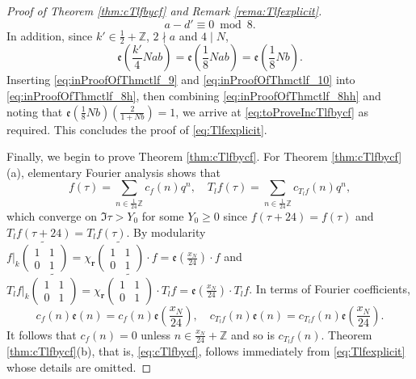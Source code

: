 \documentclass[12pt]{amsart}
\numberwithin{equation}{section}
\theoremstyle{plain}
\theoremstyle{definition}
\theoremstyle{remark}
\newcommand\legendre[2]{\genfrac{(}{)}{}{}{#1}{#2}}
\newcommand\tbtmat[4]{\left(\begin{smallmatrix}{#1} & {#2} \\ {#3} & {#4}\end{smallmatrix}\right)}
\newcommand\etp[1]{\mathfrak{e}\left(#1\right)}
\newcommand\numZ{\mathbb{Z}}
\begin{document}
\begin{proof}[Proof of Theorem \ref{thm:cTlfbycf} and Remark \ref{rema:Tlfexplicit}]
\begin{equation}
\label{eq:inProofOfThmctlf_9}
a-d'\equiv0\bmod{8}.
\end{equation}
In addition, since $k'\in\frac{1}{2}+\numZ$, $2\nmid a$ and $4\mid N$,
\begin{equation}
\label{eq:inProofOfThmctlf_10}
\etp{\frac{k'}{4}Nab}=\etp{\frac{1}{8}Nab}=\etp{\frac{1}{8}Nb}.
\end{equation}
Inserting \eqref{eq:inProofOfThmctlf_9} and \eqref{eq:inProofOfThmctlf_10} into \eqref{eq:inProofOfThmctlf_8h}, then combining \eqref{eq:inProofOfThmctlf_8hh} and noting that $\etp{\frac{1}{8}Nb}\legendre{2}{1+Nb}=1$, we arrive at \eqref{eq:toProveIncTlfbycf} as required. This concludes the proof of \eqref{eq:Tlfexplicit}.

Finally, we begin to prove Theorem \ref{thm:cTlfbycf}. For Theorem \ref{thm:cTlfbycf}(a), elementary Fourier analysis shows that
\begin{equation*}
f(\tau)=\sum_{n\in\frac{1}{24}\numZ}c_f(n)q^n,\quad T_lf(\tau)=\sum_{n\in\frac{1}{24}\numZ}c_{T_lf}(n)q^n,
\end{equation*}
which converge on $\Im\tau>Y_0$ for some $Y_0\geq0$ since $f(\tau+24)=f(\tau)$ and $T_lf(\tau+24)=T_lf(\tau)$. By modularity $f\vert_k\widetilde{\tbtmat{1}{1}{0}{1}}=\chi_{\mathbf{r}}\widetilde{\tbtmat{1}{1}{0}{1}}\cdot f=\etp{\frac{x_N}{24}}\cdot f$ and $T_lf\vert_k\widetilde{\tbtmat{1}{1}{0}{1}}=\chi_{\mathbf{r}}\widetilde{\tbtmat{1}{1}{0}{1}}\cdot T_lf=\etp{\frac{x_N}{24}}\cdot T_lf$. In terms of Fourier coefficients,
\begin{equation*}
c_f(n)\etp{n}=c_f(n)\etp{\frac{x_N}{24}},\quad c_{T_lf}(n)\etp{n}=c_{T_lf}(n)\etp{\frac{x_N}{24}}.
\end{equation*}
It follows that $c_f(n)=0$ unless $n\in\frac{x_N}{24}+\numZ$ and so is $c_{T_lf}(n)$. Theorem \ref{thm:cTlfbycf}(b), that is, \eqref{eq:cTlfbycf}, follows immediately from \eqref{eq:Tlfexplicit} whose details are omitted.
\end{proof}
\end{document}
